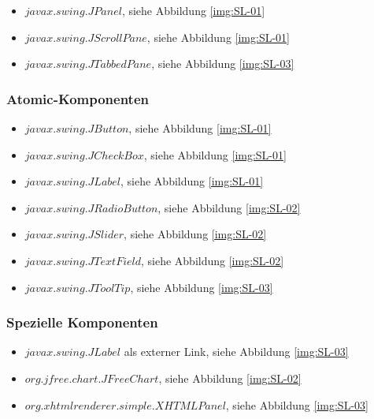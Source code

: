   \begin{itemize}
    \item \(javax.swing.JPanel\), siehe Abbildung \ref{img:SL-01}
    \item \(javax.swing.JScrollPane\), siehe Abbildung \ref{img:SL-01}
    \item \(javax.swing.JTabbedPane\), siehe Abbildung \ref{img:SL-03}
  \end{itemize}
  
  \subsubsection{Atomic-Komponenten}
  
  \begin{itemize}
    \item \(javax.swing.JButton\), siehe Abbildung \ref{img:SL-01}
    \item \(javax.swing.JCheckBox\), siehe Abbildung \ref{img:SL-01}
    \item \(javax.swing.JLabel\), siehe Abbildung \ref{img:SL-01}
    \item \(javax.swing.JRadioButton\), siehe Abbildung \ref{img:SL-02}
    \item \(javax.swing.JSlider\), siehe Abbildung \ref{img:SL-02}
    \item \(javax.swing.JTextField\), siehe Abbildung \ref{img:SL-02}
    \item \(javax.swing.JToolTip\), siehe Abbildung \ref{img:SL-03}
  \end{itemize}
  
  \subsubsection{Spezielle Komponenten}
  
  \begin{itemize}
    \item \(javax.swing.JLabel\) als externer Link, siehe Abbildung
    \ref{img:SL-03}
    \item \(org.jfree.chart.JFreeChart\), siehe Abbildung \ref{img:SL-02}
    \item \(org.xhtmlrenderer.simple.XHTMLPanel\), siehe Abbildung
    \ref{img:SL-03}
  \end{itemize}
  
